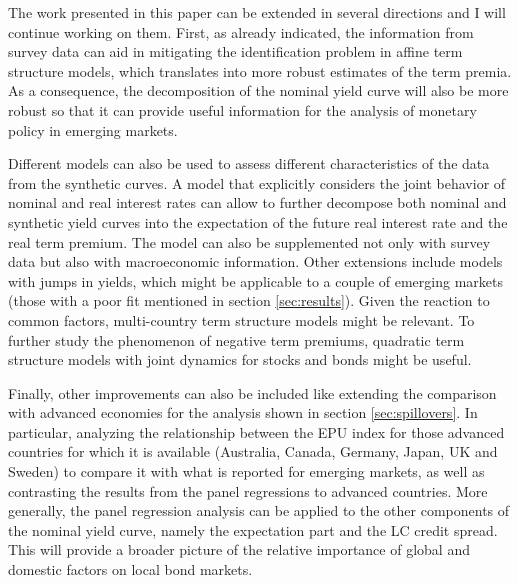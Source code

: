 {The work presented in this paper can be extended in several directions and I will continue working on them. First, as already indicated, the information from survey data can aid in mitigating the identification problem in affine term structure models, which translates into more robust estimates of the term premia. As a consequence, the decomposition of the nominal yield curve will also be more robust so that it can provide useful information for the analysis of monetary policy in emerging markets.

Different models can also be used to assess different characteristics of the data from the synthetic curves. A model that explicitly considers the joint behavior of nominal and real interest rates can allow to further decompose both nominal and synthetic yield curves into the expectation of the future real interest rate and the real term premium. The model can also be supplemented not only with survey data but also with macroeconomic information. Other extensions include models with jumps in yields, which might be applicable to a couple of emerging markets (those with a poor fit mentioned in section \ref{sec:results}). Given the reaction to common factors, multi-country term structure models might be relevant. To further study the phenomenon of negative term premiums, quadratic term structure models with joint dynamics for stocks and bonds might be useful.

Finally, other improvements can also be included like extending the comparison with advanced economies for the analysis shown in section \ref{sec:spillovers}. In particular, analyzing the relationship between the EPU index for those advanced countries for which it is available (Australia, Canada, Germany, Japan, UK and Sweden) to compare it with what is reported for emerging markets, as well as contrasting the results from the panel regressions to advanced countries. More generally, the panel regression analysis can be applied to the other components of the nominal yield curve, namely the expectation part and the LC credit spread. This will provide a broader picture of the relative importance of global and domestic factors on local bond markets.

}{}	%



